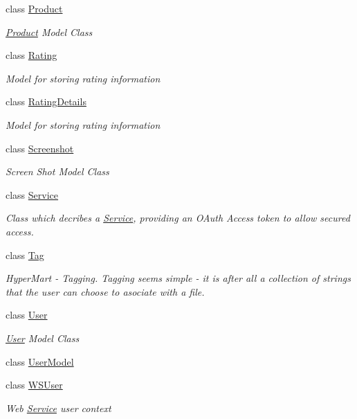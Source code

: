 \begin{DoxyCompactItemize}
class \hyperlink{class_open_1_1_g_i_1_1hypermart_1_1_models_1_1_product}{Product}
\begin{DoxyCompactList}\small\item\em \hyperlink{class_open_1_1_g_i_1_1hypermart_1_1_models_1_1_product}{Product} Model Class \end{DoxyCompactList}\item 
class \hyperlink{class_open_1_1_g_i_1_1hypermart_1_1_models_1_1_rating}{Rating}
\begin{DoxyCompactList}\small\item\em Model for storing rating information \end{DoxyCompactList}\item 
class \hyperlink{class_open_1_1_g_i_1_1hypermart_1_1_models_1_1_rating_details}{Rating\+Details}
\begin{DoxyCompactList}\small\item\em Model for storing rating information \end{DoxyCompactList}\item 
class \hyperlink{class_open_1_1_g_i_1_1hypermart_1_1_models_1_1_screenshot}{Screenshot}
\begin{DoxyCompactList}\small\item\em Screen Shot Model Class \end{DoxyCompactList}\item 
class \hyperlink{class_open_1_1_g_i_1_1hypermart_1_1_models_1_1_service}{Service}
\begin{DoxyCompactList}\small\item\em Class which decribes a \hyperlink{class_open_1_1_g_i_1_1hypermart_1_1_models_1_1_service}{Service}, providing an O\+Auth Access token to allow secured access. \end{DoxyCompactList}\item 
class \hyperlink{class_open_1_1_g_i_1_1hypermart_1_1_models_1_1_tag}{Tag}
\begin{DoxyCompactList}\small\item\em Hyper\+Mart -\/ Tagging. Tagging seems simple -\/ it is after all a collection of strings that the user can choose to asociate with a file. \end{DoxyCompactList}\item 
class \hyperlink{class_open_1_1_g_i_1_1hypermart_1_1_models_1_1_user}{User}
\begin{DoxyCompactList}\small\item\em \hyperlink{class_open_1_1_g_i_1_1hypermart_1_1_models_1_1_user}{User} Model Class \end{DoxyCompactList}\item 
class \hyperlink{class_open_1_1_g_i_1_1hypermart_1_1_models_1_1_user_model}{User\+Model}
\item 
class \hyperlink{class_open_1_1_g_i_1_1hypermart_1_1_models_1_1_w_s_user}{W\+S\+User}
\begin{DoxyCompactList}\small\item\em Web \hyperlink{class_open_1_1_g_i_1_1hypermart_1_1_models_1_1_service}{Service} user context \end{DoxyCompactList}\end{DoxyCompactItemize}
